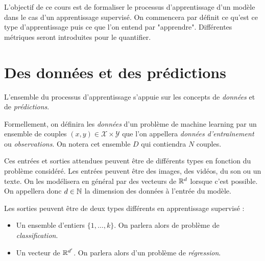 
\minitoc 

L'objectif de ce cours est de formaliser le processus d'apprentissage d'un modèle dans le cas d'un apprentissage supervisé. On commencera par définit ce qu'est ce type d'apprentissage puis ce que l'on entend par "apprendre". Différentes métriques seront introduites pour le quantifier. 


\section{Des données et des prédictions}

L'ensemble du processus d'apprentissage s'appuie sur les concepts de \emph{données} et de \emph{prédictions}. 

\begin{definition}[Observations]
    Formellement, on définira les \emph{données} d'un problème de machine learning par un ensemble de couples $(x,y) \in \mathcal{X} \times \mathcal{Y}$ que l'on appellera \emph{données d'entraînement} ou \emph{observations}. On notera cet ensemble $D$ qui contiendra $N$ couples. 
\end{definition}

Ces entrées et sorties attendues peuvent être de différents types en fonction du problème considéré. Les entrées peuvent être des images, des vidéos, du son ou un texte. On les modélisera en général par des vecteurs de $\mathbb{R}^d$ lorsque c'est possible. On appellera donc $d \in \mathbb{N}$ la dimension des données à l'entrée du modèle. 

Les sorties peuvent être de deux types différents en apprentissage supervisé :
\begin{itemize}
    \item Un ensemble d'entiers $\{1, \dots, k\}$. On parlera alors de problème de \emph{classification}. 
    \item Un vecteur de $\mathbb{R}^{d'}$. On parlera alors d'un problème de \emph{régression}. 
\end{itemize}


